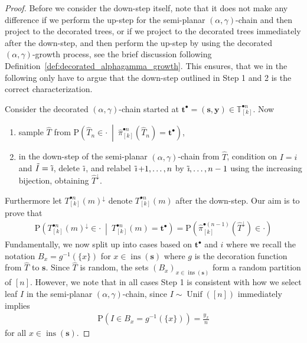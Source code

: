 \documentclass[a4paper, final]{amsart}
\theoremstyle{plain}
\theoremstyle{definition}
\newcommand{\tree}[1][t]{\boldsymbol{#1}}
\newcommand{\That}[1][T]{\widehat{#1}}
\newcommand{\T}{\mathbb{T}}
\DeclareMathOperator{\insertable}{ins}
\newcommand{\insertablef}[1][\tree]{\insertable({\tree[#1]})}
\DeclareMathOperator{\tildei}{\tilde{\textit{\i}}}
\renewcommand{\P}{\mathrm{P}}
\DeclareMathOperator{\Unif}{Unif}
\begin{document}
\begin{proof}
  Before we consider the down-step itself, note that it does not make any difference if we perform the up-step for the semi-planar $(\alpha, \gamma)$-chain and then project to the decorated trees, or if we project to the decorated trees immediately after the down-step, and then perform the up-step by using the decorated $(\alpha, \gamma)$-growth process, see the brief discussion following Definition~\ref{def:decorated_alphagamma_growth}.
  This ensures, that we in the following only have to argue that the down-step outlined in Step 1 and 2 is the correct characterization. 

  Consider the decorated $(\alpha, \gamma)$-chain started at $\tree^\bullet = (\tree[s], \mathbf{y}) \in \T_{[k]}^{\bullet n}$.
  Now
  \begin{enumerate}
    \item sample $\That$ from $\P \left( \That_n \in \cdot \ \middle \vert \ \hat{\pi}_{[k]}^{\bullet n} \left( \That_n \right) = \tree^\bullet \right)$,
    \item in the down-step of the semi-planar $(\alpha, \gamma)$-chain from $\That$, condition on $I = i$ and $\tilde{I} = \tildei$, delete $\tildei$, and relabel $\tildei + 1, \ldots, n$ by $\tildei, \ldots, n-1$ using the increasing bijection, obtaining $\That^\downarrow$.
  \end{enumerate}
  Furthermore let $T_{[k]}^{\bullet n}{(m)}^\downarrow$ denote $T_{[k]}^{\bullet n} (m)$ after the down-step.
  Our aim is to prove that
  \begin{align}
    \P \left( T_{[k]}^{\bullet n}{(m)}^\downarrow \in \cdot \ \middle \vert \ T_{[k]}^{\bullet n}{(m)} = \tree^\bullet \right)
    = \P \left( \hat{\pi}_{[k]}^{\bullet (n-1)} \left( \That^\downarrow \right) \in \cdot \right) 
    \label{eq:decorated_downstep_distribution}
  \end{align}
  Fundamentally, we now split up into cases based on $\tree^\bullet$ and $i$ where we recall the notation $B_x = g^{-1}(\{x\})$ for $x \in \insertablef[s]$ where $g$ is the decoration function from $\hat{T}$ to $\tree[s]$.
  Since $\hat{T}$ is random, the sets ${\left( B_x \right)}_{x \in \insertablef[s]}$ form a random partition of $[n]$.
  However, we note that in all cases Step 1 is consistent with how we select leaf $I$ in the semi-planar $(\alpha, \gamma)$-chain, since $I \sim \Unif ([n])$ immediately implies
  \begin{align*}
    \P \left( I \in B_x = g^{-1}(\{x\}) \right) = \frac{y_x}{n}
  \end{align*}
  for all $x \in \insertablef[s]$.
  

\end{proof}
\end{document}
